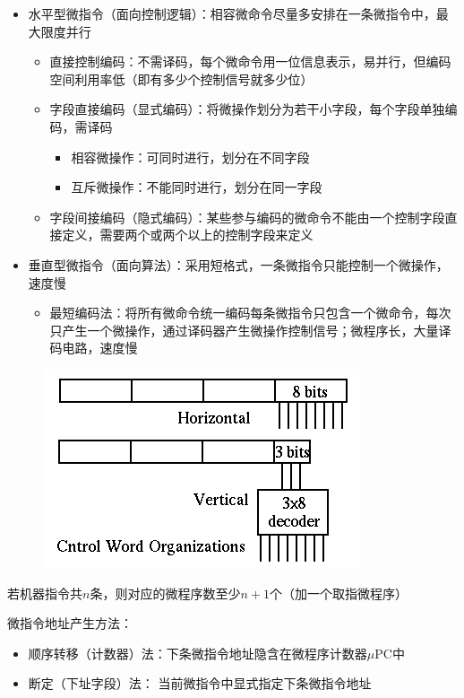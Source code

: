 \begin{itemize}
	\item 水平型微指令（面向控制逻辑）：相容微命令尽量多安排在一条微指令中，最大限度并行
	\begin{itemize}
		\item 直接控制编码：不需译码，每个微命令用一位信息表示，易并行，但编码空间利用率低（即有多少个控制信号就多少位）
		\item 字段直接编码（显式编码）：将微操作划分为若干小字段，每个字段单独编码，需译码
		\begin{itemize}
			\item 相容微操作：可同时进行，划分在不同字段
			\item 互斥微操作：不能同时进行，划分在同一字段
		\end{itemize}
		\item 字段间接编码（隐式编码）：某些参与编码的微命令不能由一个控制字段直接定义，需要两个或两个以上的控制字段来定义
	\end{itemize}
	\item 垂直型微指令（面向算法）：采用短格式，一条微指令只能控制一个微操作，速度慢
	\begin{itemize}
		\item 最短编码法：将所有微命令统一编码每条微指令只包含一个微命令，每次只产生一个微操作，通过译码器产生微操作控制信号；微程序长，大量译码电路，速度慢
	\end{itemize}
\end{itemize}
\begin{figure}[H]
\centering
\includegraphics[width=0.4\linewidth]{fig/microinstruction.png}
\end{figure}
若机器指令共$n$条，则对应的微程序数至少$n+1$个（加一个取指微程序）
\par 微指令地址产生方法：
\begin{itemize}
	\item 顺序转移（计数器）法：下条微指令地址隐含在微程序计数器$\mu$PC中
	\item 断定（下址字段）法： 当前微指令中显式指定下条微指令地址
\end{itemize}